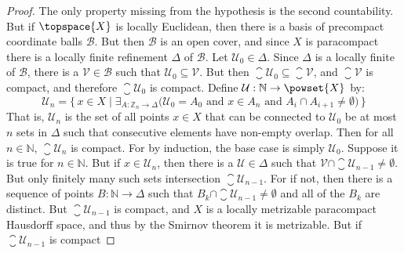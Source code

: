 \documentclass{article}                                                        %
\begin{document}
            \begin{proof}
                The only property missing from the hypothesis is the second
                countability. But if $\topspace{X}$ is locally Euclidean, then
                there is a basis of precompact coordinate balls $\mathcal{B}$.
                But then $\mathcal{B}$ is an open cover, and since $X$ is
                paracompact there is a locally finite refinement $\Delta$ of
                $\mathcal{B}$. Let $\mathcal{U}_{0}\in\Delta$. Since $\Delta$ is
                a locally finite of $\mathcal{B}$, there is a
                $\mathcal{V}\in\mathcal{B}$ such that
                $\mathcal{U}_{0}\subseteq\mathcal{V}$. But then
                $\closure{\mathcal{U}_{0}}\subseteq\closure{\mathcal{V}}$, and
                $\closure{\mathcal{V}}$ is compact, and therefore
                $\closure{\mathcal{U}_{0}}$ is compact. Define
                $\mathcal{U}:\mathbb{N}\rightarrow\powset{X}$ by:
                \begin{equation}
                    \mathcal{U}_{n}=\Big\{\,x\in{X}\;|\;
                        \exists_{A:\mathbb{Z}_{n}\rightarrow\Delta}
                        \big(\mathcal{U}_{0}=A_{0}\textrm{ and }
                         x\in{A}_{n}\textrm{ and }
                         A_{i}\cap{A}_{i+1}\ne\emptyset\big)\,\Big\}
                \end{equation}
                That is, $\mathcal{U}_{n}$ is the set of all points $x\in{X}$
                that can be connected to $\mathcal{U}_{0}$ be at most $n$
                sets in $\Delta$ such that consecutive elements have non-empty
                overlap. Then for all $n\in\mathbb{N}$,
                $\closure{\mathcal{U}_{n}}$ is compact. For by induction, the
                base case is simply $\mathcal{U}_{0}$. Suppose it is true for
                $n\in\mathbb{N}$. But if $x\in\mathcal{U}_{n}$, then there is a
                $\mathcal{U}\in\Delta$ such that
                $\mathcal{V}\cap\closure{\mathcal{U}_{n-1}}\ne\emptyset$. But
                only finitely many such sets intersection
                $\closure{\mathcal{U}_{n-1}}$. For if not, then there is a
                sequence of points $B:\mathbb{N}\rightarrow\Delta$ such that
                $B_{k}\cap\closure{\mathcal{U}_{n-1}}\ne\emptyset$ and all of
                the $B_{k}$ are distinct. But $\closure{\mathcal{U}_{n-1}}$
                is compact, and $X$ is a locally metrizable paracompact
                Hausdorff space, and thus by the Smirnov theorem it is
                metrizable. But if $\closure{\mathcal{U}_{n-1}}$ is compact

\end{proof}
\end{document}
